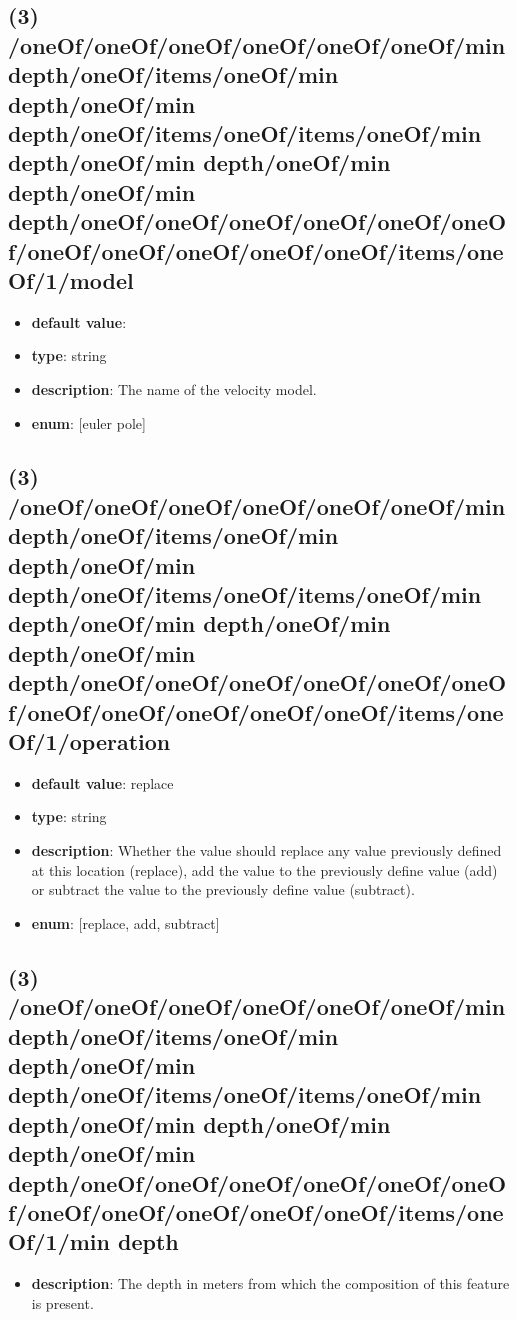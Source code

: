 \subsection{(3) /oneOf/oneOf/oneOf/oneOf/oneOf/oneOf/min depth/oneOf/items/oneOf/min depth/oneOf/min depth/oneOf/items/oneOf/items/oneOf/min depth/oneOf/min depth/oneOf/min depth/oneOf/min depth/oneOf/oneOf/oneOf/oneOf/oneOf/oneOf/oneOf/oneOf/oneOf/oneOf/oneOf/items/oneOf/1/model}
\begin{itemize}[leftmargin=3em]\item {\bf default value}: 
\item {\bf type}: string
\item {\bf description}: The name of the velocity model.
\item {\bf enum}: [euler pole]\end{itemize}\subsection{(3) /oneOf/oneOf/oneOf/oneOf/oneOf/oneOf/min depth/oneOf/items/oneOf/min depth/oneOf/min depth/oneOf/items/oneOf/items/oneOf/min depth/oneOf/min depth/oneOf/min depth/oneOf/min depth/oneOf/oneOf/oneOf/oneOf/oneOf/oneOf/oneOf/oneOf/oneOf/oneOf/oneOf/items/oneOf/1/operation}
\begin{itemize}[leftmargin=3em]\item {\bf default value}: replace
\item {\bf type}: string
\item {\bf description}: Whether the value should replace any value previously defined at this location (replace), add the value to the previously define value (add) or subtract the value to the previously define value (subtract).
\item {\bf enum}: [replace, add, subtract]\end{itemize}\subsection{(3) /oneOf/oneOf/oneOf/oneOf/oneOf/oneOf/min depth/oneOf/items/oneOf/min depth/oneOf/min depth/oneOf/items/oneOf/items/oneOf/min depth/oneOf/min depth/oneOf/min depth/oneOf/min depth/oneOf/oneOf/oneOf/oneOf/oneOf/oneOf/oneOf/oneOf/oneOf/oneOf/oneOf/items/oneOf/1/min depth}
\begin{itemize}[leftmargin=3em]\item {\bf description}: The depth in meters from which the composition of this feature is present.
\end{itemize}
